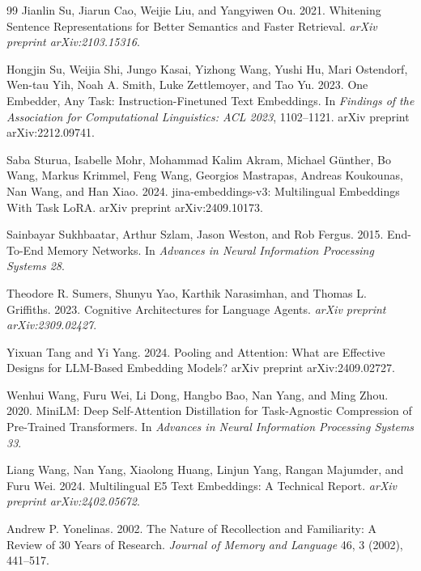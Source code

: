 \documentclass[manuscript]{acmart}
\begin{document}
\begin{thebibliography}{99}
Jianlin Su, Jiarun Cao, Weijie Liu, and Yangyiwen Ou. 2021.
\newblock Whitening Sentence Representations for Better Semantics and Faster Retrieval.
\newblock \emph{arXiv preprint arXiv:2103.15316}.

Hongjin Su, Weijia Shi, Jungo Kasai, Yizhong Wang, Yushi Hu, Mari Ostendorf, Wen-tau Yih, Noah A. Smith, Luke Zettlemoyer, and Tao Yu. 2023.
\newblock One Embedder, Any Task: Instruction-Finetuned Text Embeddings.
\newblock In \emph{Findings of the Association for Computational Linguistics: ACL 2023}, 1102--1121. arXiv preprint arXiv:2212.09741.

Saba Sturua, Isabelle Mohr, Mohammad Kalim Akram, Michael G\"unther, Bo Wang, Markus Krimmel, Feng Wang, Georgios Mastrapas, Andreas Koukounas, Nan Wang, and Han Xiao. 2024.
\newblock jina-embeddings-v3: Multilingual Embeddings With Task LoRA.
\newblock arXiv preprint arXiv:2409.10173.

Sainbayar Sukhbaatar, Arthur Szlam, Jason Weston, and Rob Fergus. 2015.
\newblock End-To-End Memory Networks.
\newblock In \emph{Advances in Neural Information Processing Systems 28}.

Theodore R. Sumers, Shunyu Yao, Karthik Narasimhan, and Thomas L. Griffiths. 2023.
\newblock Cognitive Architectures for Language Agents.
\newblock \emph{arXiv preprint arXiv:2309.02427}.

Yixuan Tang and Yi Yang. 2024.
\newblock Pooling and Attention: What are Effective Designs for LLM-Based Embedding Models?
\newblock arXiv preprint arXiv:2409.02727.

Wenhui Wang, Furu Wei, Li Dong, Hangbo Bao, Nan Yang, and Ming Zhou. 2020.
\newblock MiniLM: Deep Self-Attention Distillation for Task-Agnostic Compression of Pre-Trained Transformers.
\newblock In \emph{Advances in Neural Information Processing Systems 33}.

Liang Wang, Nan Yang, Xiaolong Huang, Linjun Yang, Rangan Majumder, and Furu Wei. 2024.
\newblock Multilingual E5 Text Embeddings: A Technical Report.
\newblock \emph{arXiv preprint arXiv:2402.05672}.

Andrew P. Yonelinas. 2002.
\newblock The Nature of Recollection and Familiarity: A Review of 30 Years of Research.
\newblock \emph{Journal of Memory and Language} 46, 3 (2002), 441--517.


\end{thebibliography}
\end{document}
